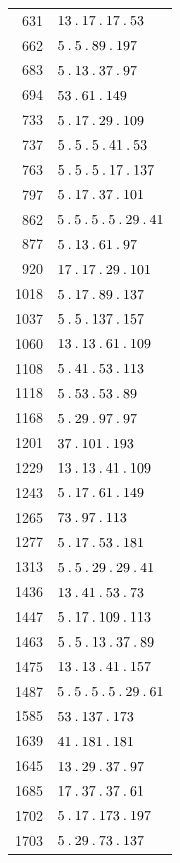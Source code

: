 \begin{longtable}{@{}r|l@{}}
631 & $13\mathbin{.} 17\mathbin{.} 17\mathbin{.} 53$\\
662 & $5\mathbin{.} 5\mathbin{.} 89\mathbin{.} 197$\\
683 & $5\mathbin{.} 13\mathbin{.} 37\mathbin{.} 97$\\
694 & $53\mathbin{.} 61\mathbin{.} 149$\\
733 & $5\mathbin{.} 17\mathbin{.} 29\mathbin{.} 109$\\
737 & $5\mathbin{.} 5\mathbin{.} 5\mathbin{.} 41\mathbin{.} 53$\\
763 & $5\mathbin{.} 5\mathbin{.} 5\mathbin{.} 17\mathbin{.} 137$\\
797 & $5\mathbin{.} 17\mathbin{.} 37\mathbin{.} 101$\\
862 & $5\mathbin{.} 5\mathbin{.} 5\mathbin{.} 5\mathbin{.} 29\mathbin{.} 41$\\
877 & $5\mathbin{.} 13\mathbin{.} 61\mathbin{.} 97$\\
920 & $17\mathbin{.} 17\mathbin{.} 29\mathbin{.} 101$\\
1018 & $5\mathbin{.} 17\mathbin{.} 89\mathbin{.} 137$\\
1037 & $5\mathbin{.} 5\mathbin{.} 137\mathbin{.} 157$\\
1060 & $13\mathbin{.} 13\mathbin{.} 61\mathbin{.} 109$\\
1108 & $5\mathbin{.} 41\mathbin{.} 53\mathbin{.} 113$\\
1118 & $5\mathbin{.} 53\mathbin{.} 53\mathbin{.} 89$\\
1168 & $5\mathbin{.} 29\mathbin{.} 97\mathbin{.} 97$\\
1201 & $37\mathbin{.} 101\mathbin{.} 193$\\
1229 & $13\mathbin{.} 13\mathbin{.} 41\mathbin{.} 109$\\
1243 & $5\mathbin{.} 17\mathbin{.} 61\mathbin{.} 149$\\
1265 & $73\mathbin{.} 97\mathbin{.} 113$\\
1277 & $5\mathbin{.} 17\mathbin{.} 53\mathbin{.} 181$\\
1313 & $5\mathbin{.} 5\mathbin{.} 29\mathbin{.} 29\mathbin{.} 41$\\
1436 & $13\mathbin{.} 41\mathbin{.} 53\mathbin{.} 73$\\
1447 & $5\mathbin{.} 17\mathbin{.} 109\mathbin{.} 113$\\
1463 & $5\mathbin{.} 5\mathbin{.} 13\mathbin{.} 37\mathbin{.} 89$\\
1475 & $13\mathbin{.} 13\mathbin{.} 41\mathbin{.} 157$\\
1487 & $5\mathbin{.} 5\mathbin{.} 5\mathbin{.} 5\mathbin{.} 29\mathbin{.} 61$\\
1585 & $53\mathbin{.} 137\mathbin{.} 173$\\
1639 & $41\mathbin{.} 181\mathbin{.} 181$\\
1645 & $13\mathbin{.} 29\mathbin{.} 37\mathbin{.} 97$\\
1685 & $17\mathbin{.} 37\mathbin{.} 37\mathbin{.} 61$\\
1702 & $5\mathbin{.} 17\mathbin{.} 173\mathbin{.} 197$\\
1703 & $5\mathbin{.} 29\mathbin{.} 73\mathbin{.} 137$\\

\end{longtable}

